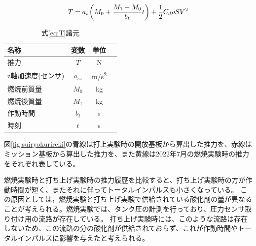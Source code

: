 \documentclass[a4paper,11pt,titlepage,uplatex]{jsarticle}
\begin{document}
\begin{equation}
    T = a_z\qty(M_0 + \frac{M_1-M_0}{b_t}t)+\frac{1}{2}C_d \rho S V^2
    \label{eq:T}
\end{equation}

\begin{table}[H]
    \centering
    \caption{式\eqref{eq:T}諸元}
    \label{tab:eqshogen}
    \begin{tabular}{lccr}
        \toprule
        名称         & 変数       & 単位         \\
        \midrule
        推力         & $T$      & \si{N}     \\
        z軸加速度(センサ) & $a_{sz}$ & \si{m/s^2} \\
        燃焼前質量      & $M_0$    & \si{kg}    \\
        燃焼後質量      & $M_1$    & \si{kg}    \\
        作動時間       & $b_t$    & \si{s}     \\
        時刻         & $t$      & \si{s}     \\
        \bottomrule
    \end{tabular}
\end{table}

図\ref{fig:suiryokurireki}の青線は打上実験時の開放基板から算出した推力を、赤線はミッション基板から算出した推力を、また黄線は2022年7月の燃焼実験時の推力をそれぞれ表している。

燃焼実験時と打ち上げ実験時の推力履歴を比較すると、打ち上げ実験時の方が作動時間が短く、またそれに伴ってトータルインパルスも小さくなっている。
この原因としては，燃焼実験と打ち上げ実験で供給されている酸化剤の量が異なることが考えられる。燃焼実験では、タンク圧の計測を行っており、圧力センサ取り付け用の流路が存在している。
打ち上げ実験時には、このような流路は存在しないため、この流路の分の酸化剤が供給されておらず、これが作動時間やトータルインパルスに影響を与えたと考えられる。
\end{document}
